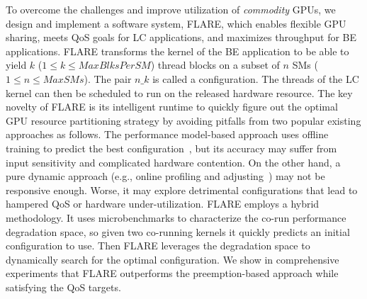 To overcome the challenges and improve utilization of {\em commodity} GPUs, we design and implement a software system, FLARE, which enables flexible GPU sharing, meets QoS goals for LC applications, and maximizes throughput for BE applications. FLARE transforms the kernel of the BE application to be able to yield $k$ ($1 \leq k \leq MaxBlksPerSM$) thread blocks on a subset of $n$ SMs ($1 \leq n \leq MaxSMs$). The pair $n\_k$ is called a configuration. The threads of the LC kernel can then be scheduled to run on the released hardware resource. The key novelty of FLARE is its intelligent runtime to quickly figure out the optimal GPU resource partitioning strategy by avoiding pitfalls from two popular existing approaches as follows. The performance model-based approach uses offline training to predict the best configuration~\cite{Chen+:ASPLOS16,Zhang:2014}, but its accuracy may suffer from input sensitivity and complicated hardware contention. On the other hand, a pure dynamic approach (e.g., online profiling and adjusting~\cite{Lo:2015,Zhu+:ASPLOS16}) may not be responsive enough. Worse, it may explore detrimental configurations that lead to hampered QoS or hardware under-utilization. FLARE employs a hybrid methodology. It uses microbenchmarks to characterize the co-run performance degradation space, so given two co-running kernels it quickly predicts an initial configuration to use. Then FLARE leverages the degradation space to dynamically search for the optimal configuration. We show in comprehensive experiments that FLARE outperforms the preemption-based approach while satisfying the QoS targets.
